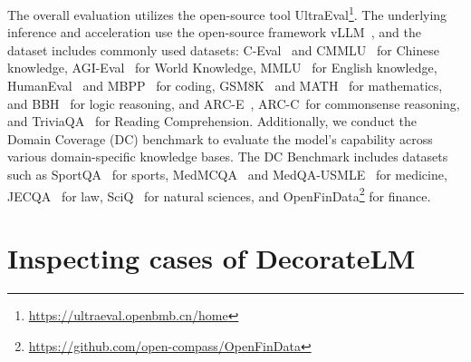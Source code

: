 \documentclass[11pt]{article}
\begin{document}
The overall evaluation utilizes the open-source tool UltraEval\footnote{\url{https://ultraeval.openbmb.cn/home}}. The underlying
inference and acceleration use the open-source framework vLLM~\citep{kwon2023efficient}, and the dataset includes commonly used datasets: C-Eval~\citep{huang2024c} and CMMLU~\citep{li2023cmmlu} for Chinese knowledge, AGI-Eval~\citep{zhong2023agieval} for World Knowledge, MMLU~\citep{hendrycks2020measuring} for English knowledge, HumanEval~\citep{chen2021evaluating} and MBPP~\citep{austin2021program} for coding, GSM8K~\citep{cobbe2021training} and MATH~\citep{hendrycks2021measuring} for mathematics, and BBH~\citep{srivastava2022beyond} for logic reasoning, and ARC-E~\citep{clark2018think}, ARC-C~\citep{clark2018think}for commonsense reasoning, and TriviaQA~\citep{joshi2017triviaqa} for Reading Comprehension. Additionally, we conduct the Domain Coverage (DC) benchmark to evaluate the model's capability across various domain-specific knowledge bases. The DC Benchmark includes datasets such as SportQA~\citep{xia2024sportqa} for sports, MedMCQA~\citep{pal2022medmcqa} and MedQA-USMLE~\citep{jin2021disease} for medicine, JECQA~\citep{zhong2020jec} for law, SciQ~\citep{welbl2017crowdsourcing} for natural sciences, and OpenFinData\footnote{\url{https://github.com/open-compass/OpenFinData}} for finance.

\section{Inspecting cases of DecorateLM}
\label{case_study}

\end{document}
